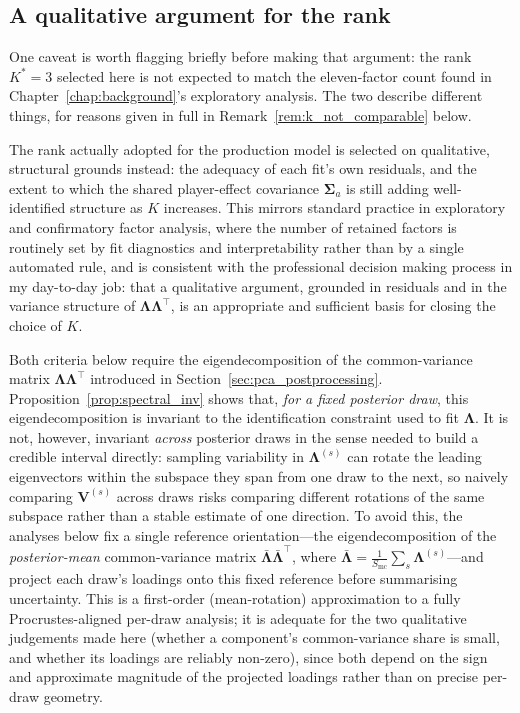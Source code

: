 \subsection{A qualitative argument for the rank}
\label{sec:rank_qualitative}

One caveat is worth flagging briefly before making that argument: the rank $K^*=3$ selected here is not expected to match the eleven-factor count found in Chapter~\ref{chap:background}'s exploratory analysis. The two describe different things, for reasons given in full in Remark~\ref{rem:k_not_comparable} below.

The rank actually adopted for the production model is selected on qualitative, structural grounds instead: the adequacy of each fit's own residuals, and the extent to which the shared player-effect covariance $\boldsymbol{\Sigma}_a$ is still adding well-identified structure as $K$ increases. This mirrors standard practice in exploratory and confirmatory factor analysis, where the number of retained factors is routinely set by fit diagnostics and interpretability rather than by a single automated rule, and is consistent with the professional decision making process in my day-to-day job: that a qualitative argument, grounded in residuals and in the variance structure of $\boldsymbol{\Lambda}\boldsymbol{\Lambda}^\top$, is an appropriate and sufficient basis for closing the choice of $K$.

\begin{remark}
\label{rem:posterior_mean_anchor}
Both criteria below require the eigendecomposition of the common-variance matrix $\boldsymbol{\Lambda}\boldsymbol{\Lambda}^\top$ introduced in Section~\ref{sec:pca_postprocessing}. Proposition~\ref{prop:spectral_inv} shows that, \emph{for a fixed posterior draw}, this eigendecomposition is invariant to the identification constraint used to fit $\boldsymbol{\Lambda}$. It is not, however, invariant \emph{across} posterior draws in the sense needed to build a credible interval directly: sampling variability in $\boldsymbol{\Lambda}^{(s)}$ can rotate the leading eigenvectors within the subspace they span from one draw to the next, so naively comparing $\mathbf{V}^{(s)}$ across draws risks comparing different rotations of the same subspace rather than a stable estimate of one direction. To avoid this, the analyses below fix a single reference orientation---the eigendecomposition of the \emph{posterior-mean} common-variance matrix $\bar{\boldsymbol{\Lambda}}\bar{\boldsymbol{\Lambda}}^\top$, where $\bar{\boldsymbol{\Lambda}} = \tfrac{1}{S_{\mathrm{mc}}}\sum_s \boldsymbol{\Lambda}^{(s)}$---and project each draw's loadings onto this fixed reference before summarising uncertainty. This is a first-order (mean-rotation) approximation to a fully Procrustes-aligned per-draw analysis; it is adequate for the two qualitative judgements made here (whether a component's common-variance share is small, and whether its loadings are reliably non-zero), since both depend on the sign and approximate magnitude of the projected loadings rather than on precise per-draw geometry.
\end{remark}

